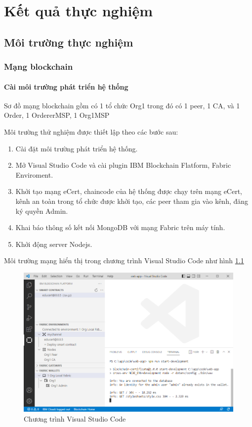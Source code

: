 \chapter{Kết quả thực nghiệm}
\section{Môi trường thực nghiệm}
\subsection{Mạng blockchain}
\subsubsection{Cài môi trường phát triển hệ thống}
Sơ đồ mạng blockchain gồm có 1 tổ chức Org1 trong đó có 1 peer, 1 CA, và 1 Order, 1 OrdererMSP, 1 Org1MSP
 
Môi trường thử nghiệm được thiết lập theo các bước sau:
\begin{enumerate}
\item Cài đặt môi trường phát triển hệ thống.
\item Mở Visual Studio Code và cài plugin IBM Blockchain Flatform, Fabric Enviroment.
\item Khởi tạo mạng eCert, chaincode của hệ thống được chạy trên mạng eCert, kênh an toàn trong tổ chức được khởi tạo, các peer tham gia vào kênh, đăng ký quyền Admin.
\item Khai báo thông số kết nối MongoDB với mạng Fabric trên máy tính.
\item Khởi động server Nodejs.
\end{enumerate}

Môi trường mạng hiển thị trong chương trình Visual Studio Code như hình \ref{fig:ide_start}
\begin{figure}[htbp]
\centering
\includegraphics[width=.9\linewidth]{img/ide_start.PNG}
\caption{Chương trình Visual Studio Code}
\label{fig:ide_start}
\end{figure}

